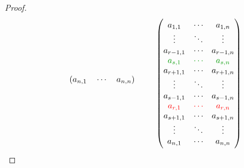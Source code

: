 \begin{lema}
\begin{col}
\begin{proof}
\[\begin{blockarray}{cccc}
\begin{block}{(ccc)*{1}{>{\color{ForestGreen}}l<{}}}
						a_{n,1}&	\cdots&		a_{n,n}& 		\\	
					\end{block}
				\end{blockarray}
				\quad
				\begin{pmatrix}
					a_{1,1}      & \cdots     & a_{1,n}      \\
					\vdots       & \ddots     & \vdots       \\
					a_{r-1,1}    & \cdots     & a_{r-1,n}    \\
					\gre a_{s,1} & \gre\cdots & \gre a_{s,n} \\
					a_{r+1,1}    & \cdots     & a_{r+1,n}    \\
					\vdots       & \ddots     & \vdots       \\
					a_{s-1,1}    & \cdots     & a_{s-1,n}    \\
					\rd a_{r,1}  & \rd\cdots  & \rd a_{r,n}  \\
					a_{s+1,1}    & \cdots     & a_{s+1,n}    \\
					\vdots       & \ddots     & \vdots       \\
					a_{n,1}      & \cdots     & a_{n,n}      \\
				\end{pmatrix}
			\]
		\end{proof}
	\end{col}
\end{lema}



